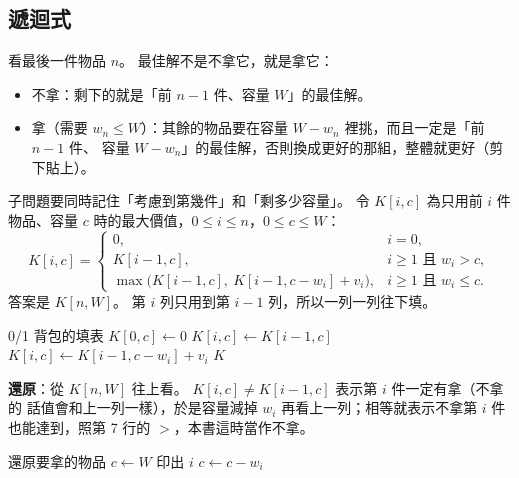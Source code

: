 \subsection{遞迴式}

看最後一件物品 $n$。 最佳解不是不拿它，就是拿它：
\begin{itemize}
\item 不拿：剩下的就是「前 $n - 1$ 件、容量 $W$」的最佳解。
\item 拿（需要 $w_n \le W$）：其餘的物品要在容量 $W - w_n$ 裡挑，而且一定是「前 $n - 1$ 件、
容量 $W - w_n$」的最佳解，否則換成更好的那組，整體就更好（剪下貼上）。
\end{itemize}
子問題要同時記住「考慮到第幾件」和「剩多少容量」。 令 $K[i, c]$ 為只用前 $i$ 件物品、容量
$c$ 時的最大價值，$0 \le i \le n$，$0 \le c \le W$：
\[
K[i, c] = \begin{cases}
0, & i = 0, \\
K[i - 1, c], & i \ge 1 \text{ 且 } w_i > c, \\
\max\bigl(K[i - 1, c],\ K[i - 1, c - w_i] + v_i\bigr), & i \ge 1 \text{ 且 } w_i \le c .
\end{cases}
\]
答案是 $K[n, W]$。 第 $i$ 列只用到第 $i - 1$ 列，所以一列一列往下填。

\begin{pseudo}[label=alg:dp-knapsack]{0/1 背包的填表}
        \State $K[0, c] \gets 0$
    \EndFor
            \State $K[i, c] \gets K[i - 1, c]$ 
                \State $K[i, c] \gets K[i - 1, c - w_i] + v_i$ 
            \EndIf
        \EndFor
    \EndFor
    \State \Return $K$
\EndFunction
\end{pseudo}

\textbf{還原}：從 $K[n, W]$ 往上看。 $K[i, c] \ne K[i - 1, c]$ 表示第 $i$ 件一定有拿（不拿的
話值會和上一列一樣），於是容量減掉 $w_i$ 再看上一列；相等就表示不拿第 $i$ 件也能達到，照第 7
行的 $>$，本書這時當作不拿。

\begin{pseudo}[label=alg:dp-knapsack-items]{還原要拿的物品}
    \State $c \gets W$
            \State 印出 $i$ 
            \State $c \gets c - w_i$
        \EndIf
    \EndFor
\EndProcedure
\end{pseudo}

